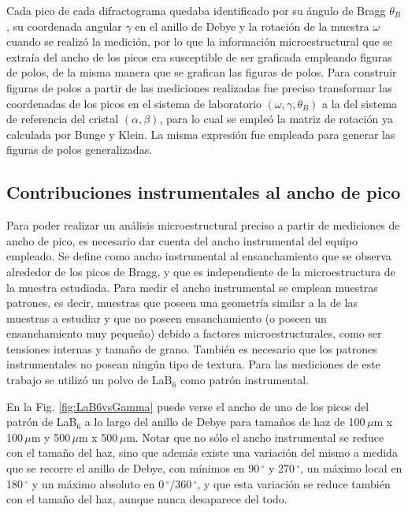 Cada pico de cada difractograma quedaba identificado por su ángulo de Bragg $\theta_B$, su coordenada angular $\gamma$ en el anillo de Debye y la rotación de la muestra $\omega$ cuando se realizó la medición, por lo que la información microestructural que se extraía del ancho de los picos era susceptible de ser graficada empleando figuras de polos, de la misma manera que se grafican las figuras de polos.
Para construir figuras de polos a partir de las mediciones realizadas fue preciso transformar las coordenadas de los picos en el sistema de laboratorio $(\omega, \gamma, \theta_B)$ a la del sistema de referencia del cristal $(\alpha, \beta)$, para lo cual se empleó la matriz de rotación ya calculada por Bunge y Klein\cite{Bunge1996}.
La misma expresión fue empleada para generar las figuras de polos generalizadas.

\subsection{Contribuciones instrumentales al ancho de pico}\label{SS:inst}
Para poder realizar un análisis microestructural preciso a partir de mediciones de ancho de pico, es necesario dar cuenta del ancho instrumental del equipo empleado.
Se define como ancho instrumental al ensanchamiento que se observa alrededor de los picos de Bragg, y que es independiente de la microestructura de la muestra estudiada.
Para medir el ancho instrumental se emplean muestras patrones, es decir, muestras que poseen una geometría similar a la de las muestras a estudiar y que no poseen ensanchamiento (o poseen un ensanchamiento muy pequeño) debido a factores microestructurales, como ser tensiones internas y tamaño de grano.
También es necesario que los patrones instrumentales no posean ningún tipo de textura.
Para las mediciones de este trabajo se utilizó un polvo de LaB$_6$ como patrón instrumental.

En la Fig. \ref{fig:LaB6vsGamma} puede verse el ancho de uno de los picos del patrón de LaB$_6$ a lo largo del anillo de Debye para tamaños de haz de 100\,$\mu$m x 100\,$\mu$m y 500\,$\mu$m x 500\,$\mu$m.
Notar que no sólo el ancho instrumental se reduce con el tamaño del haz, sino que además existe una variación del mismo a medida que se recorre el anillo de Debye, con mínimos en 90\,$^{\circ}$ y 270\,$^{\circ}$, un máximo local en 180\,$^{\circ}$ y un máximo absoluto en 0\,$^{\circ}$/360\,$^{\circ}$, y que esta variación se reduce también con el tamaño del haz, aunque nunca desaparece del todo.

